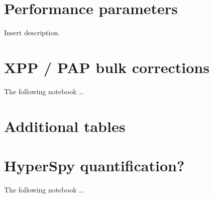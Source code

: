 



\chapter{Performance parameters}
\label{appendix:performance}

Insert description.


\chapter{XPP / PAP bulk corrections}
\label{appendix:xpp}

The following notebook \dots
% 



\chapter{Additional tables}
\label{appendix:tables}








\chapter{HyperSpy quantification?}
\label{appendix:HSquant}

The following notebook \dots
% 